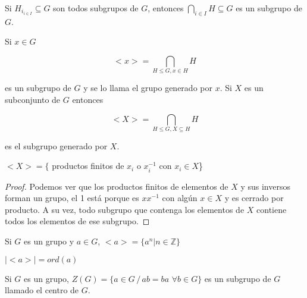 \begin{obs}
Si $H_{i_{i \in I}} \subseteq G$ son todos subgrupos de $G$, entonces $\displaystyle \bigcap_{i \in I} H \subseteq G$ es un subgrupo de $G$.
\end{obs}

\begin{defn}
Si $x \in G$

$$<x> = \displaystyle \bigcap_{H \leq G, x \in H} H$$

es un subgrupo de $G$ y se lo llama el grupo generado por $x$. Si $X$ es un subconjunto de $G$ entonces 

$$<X> = \displaystyle \bigcap_{H \leq G, X \subseteq H} H$$

es el subgrupo generado por $X$.
\end{defn}

\begin{obs}
$<X> = \{$ productos finitos de $x_i$ o $x_i^{-1}$ con $x_i \in X$\}
\end{obs}

\begin{proof}
Podemos ver que los productos finitos de elementos de $X$ y sus inversos forman un grupo, el 1 est\'a porque es $xx^{-1}$ con alg\'un $x \in X$ y es cerrado por producto. A su vez, todo subgrupo que contenga los elementos de $X$ contiene todos los elementos de ese subgrupo.
\end{proof}

\begin{obs}
Si $G$ es un grupo y $a \in G$, $<a> = \{a^n | n \in \mathbb{Z}\}$
\end{obs}

\begin{obs}
$|<a>| = ord(a)$
\end{obs}

\begin{defn}
Si $G$ es un grupo, $Z(G) = \{a \in G \, / \, ab = ba \,\, \forall b \in G\}$ es un subgrupo de $G$ llamado el centro de $G$.
\end{defn}